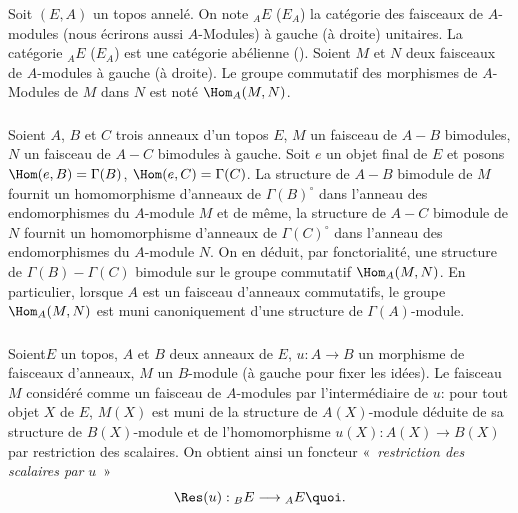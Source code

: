 \documentclass[10pt]{../fichiers-configuration-latex/smfart}
\begin{document}
\subsubsection{}
Soit $(E,A)$ un topos annelé. On note ${}_AE$ (\resp $E_A$) la
catégorie des faisceaux de $A$-modules (nous écrirons aussi
$A$-Modules) à gauche (\resp à droite) unitaires. La catégorie
${}_AE$ (\resp $E_A$) est une catégorie abélienne
(). Soient $M$ et $N$ deux faisceaux de $A$-modules
à gauche (\resp à droite). Le groupe commutatif des morphismes de
$A$-Modules de $M$ dans $N$ est noté $\Hom_A(M,N)$.

\subsubsection{}
Soient $A$, $B$ et $C$ trois anneaux d'un topos $E$, $M$ un faisceau
de $A-B$ bimodules, $N$ un faisceau de $A-C$ bimodules à gauche.
Soit $e$ un objet final de $E$ et posons $\Hom(e,B)=\Gamma(B)$,
$\Hom(e,C)=\Gamma(C)$. La structure de $A-B$ bimodule de $M$ fournit
un homomorphisme d'anneaux de $\Gamma(B)^{\circ}$ dans l'anneau des
endomorphismes du $A$-module $M$ et de même, la structure de $A-C$
bimodule de $N$ fournit un homomorphisme d'anneaux de
$\Gamma(C)^{\circ}$ dans l'anneau des endomorphismes du $A$-module
$N$. On en déduit, par fonctorialité, une structure de
$\Gamma(B)-\Gamma(C)$ bimodule sur le groupe commutatif
$\Hom_A(M,N)$. En particulier, lorsque $A$ est un faisceau d'anneaux
commutatifs, le groupe $\Hom_A(M,N)$ est muni canoniquement d'une
structure de $\Gamma(A)$-module.

\subsubsection{}
Soient\pageoriginale $E$ un topos, $A$ et $B$ deux anneaux de $E$,
$u:A\rightarrow B$ un morphisme de faisceaux d'anneaux, $M$ un
$B$-module (à gauche pour fixer les idées). Le faisceau $M$
 considéré comme un faisceau de $A$-modules par
l'intermédiaire de $u$: pour tout objet $X$ de $E$, $M(X)$ est muni
de la structure de $A(X)$-module déduite de sa structure de
$B(X)$-module et de l'homomorphisme $u(X):A(X)\rightarrow B(X)$ par
restriction des scalaires. On obtient ainsi un foncteur « \emph{restriction des scalaires par} $u$ »
$$
\Res(u):{}_BE\longrightarrow {}_AE{\quoi}.
$$
\end{document}
